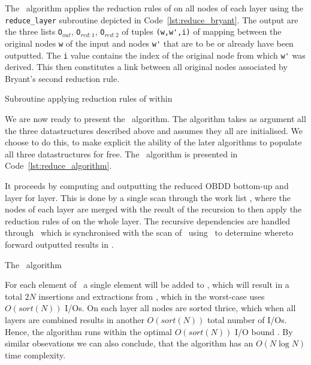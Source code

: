 The \Reduce\ algorithm applies the reduction rules of \textcite{Bryant86} on all
nodes of each layer using the \lstinline{reduce_layer} subroutine depicted in
Code~\ref{lst:reduce_bryant}. The output are the three lists
\lstinline{O}$_{\mathit{out}}$, \lstinline{O}$_{\mathit{red:}1}$,
\lstinline{O}$_{\mathit{red:}2}$ of tuples \lstinline{(w,w',i)} of mapping
between the original nodes \lstinline{w} of the input and nodes \lstinline{w'}
that are to be or already have been outputted. The \lstinline{i} value contains
the index of the original node from which \lstinline{w'} was derived. This then
constitutes a link between all original nodes associated by Bryant's second
reduction rule.

\begin{lstfloat}[ht!]
  \centering

  

  \caption{Subroutine applying reduction rules of \cite{Bryant86} within \Reduce}
  \label{lst:reduce_bryant}
\end{lstfloat}

\newpage
We are now ready to present the \Reduce\ algorithm. The algorithm takes as
argument all the three datastructures described above and assumes they all are
initialised. We choose to do this, to make explicit the ability of the later
algorithms to populate all three datastructures for free. The \Reduce\ algorithm
is presented in Code~\ref{lst:reduce_algorithm}.

It proceeds by computing and outputting the reduced OBDD bottom-up and layer for
layer. This is done by a single scan through the work list \ReduceLwork, where
the nodes of each layer are merged with the result of the recursion to then
apply the reduction rules of \cite{Bryant86} on the whole layer. The recursive
dependencies are handled through \ReduceQdep\ which is synchronised with the
scan of \ReduceLwork\ using \ReduceLdep\ to determine whereto forward outputted
results in \ReduceQdep.

\begin{lstfloat}
  \centering

  

  \caption{The \Reduce\ algorithm}
  \label{lst:reduce_algorithm}
\end{lstfloat}

For each element of \ReduceLdep\ a single element will be added to \ReduceQdep,
which will result in a total $2 N$ insertions and extractions from \ReduceQdep,
which in the worst-case uses $O(sort(N))$ I/Os. On each layer all nodes are
sorted thrice, which when all layers are combined results in another
$O(sort(N))$ total number of I/Os. Hence, the algorithm runs within the optimal
$O(sort(N))$ I/O bound \cite{Arge96}. By similar obsevations we can also
conclude, that the algorithm has an $O(N \log N)$ time complexity.

